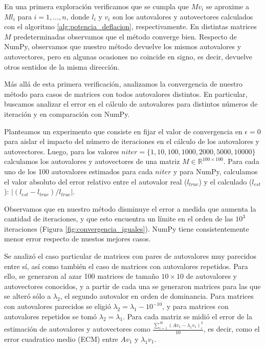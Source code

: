 \documentclass{article}
\begin{document}
En una primera exploración verificamos que se cumpla que $M v_i$ se aproxime a $M l_i$ para $i=1,\dots,n$, donde $l_i$ y $v_i$ son los autovalores y autovectores calculados con el algoritmo \ref{alg:potencia_deflacion}, respectivamente. En distintas matrices $M$ predeterminadas observamos que el método converge bien. Respecto de NumPy, observamos que nuestro método devuelve los mismos autovalores y autovectores, pero en algunas ocasiones no coincide en signo, es decir, devuelve otros sentidos de la misma dirección. 


Más allá de esta primera verificación, analizamos la convergencia de nuestro método para casos de matrices con todos autovalores distintos. En particular, buscamos analizar el error en el cálculo de autovalores para distintos números de iteración y en comparación con NumPy. 

Planteamos un experimento que consiste en fijar el valor de convergencia en $\epsilon=0$ para aislar el impacto del número de iteraciones en el cálculo de los autovalores y autovectores. Luego, para los valores $niter=\{1, 10, 100, 1000, 2000, 5000, 10000\}$ calculamos los autovalores y autovectores de una matriz $M \in \mathbb{R}^{100 \times 100}$. Para cada uno de los 100 autovalores estimados para cada $niter$ y para NumPy, calculamos el valor absoluto del error relativo entre el autovalor real ($l_{true}$) y el calculado ($l_{est}$): $|(l_{est}-l_{true})/l_{true}|$.

Observamos que en nuestro método disminuye el error a medida que aumenta la cantidad de iteraciones, y que esto encuentra un límite en el orden de las $10^3$ iteraciones (Figura \ref{fig:convergencia_iguales}). NumPy tiene consistentemente menor error respecto de nuestos mejores casos.

Se analizó el caso particular de matrices con pares de autovalores muy parecidos entre sí, así como también el caso de matrices con autovalores repetidos. Para ello, se generaron al azar 100 matrices de tamaño $10 \times 10$ de autovalores y autovectores conocidos, y a partir de cada una se generaron matrices para las que se alteró sólo a $\lambda_2$, el segundo autovalor en orden de dominancia. Para matrices con autovalores parecidos se eligió $\lambda_2 = \lambda_1 - 10^{-10}$, y para matrices con autovalores repetidos se tomó $\lambda_2 = \lambda_1$. Para cada matriz se midió el error de la estimación de autovalores y autovectores como $\frac{\sum_{i=1}^{10}(Av_1 - \lambda_1v_1)_i^2}{10}$, es decir, como el error cuadratico medio (ECM) entre $Av_1$ y $\lambda_1v_1$.
\end{document}
